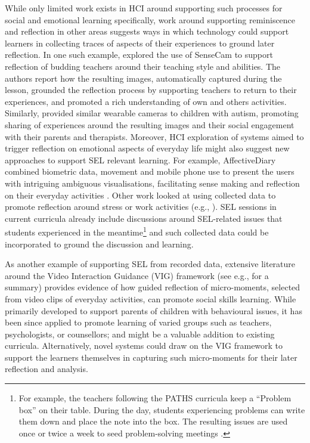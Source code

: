 \documentclass[prodmode,acmtochi]{acmsmall}
\begin{document}
While only limited work exists in HCI around supporting such processes for social and emotional learning specifically, work around supporting reminiscence and reflection in other areas suggests ways in which technology could support learners in collecting traces of aspects of their experiences to ground later reflection. In one such example,  explored the use of SenseCam to support reflection of budding teachers around their teaching style and abilities. The authors report how the resulting images, automatically captured during the lesson, grounded the reflection process by supporting teachers to return to their experiences, and promoted a rich understanding of own and others activities. Similarly,  provided similar wearable cameras to children with autism, promoting sharing of experiences around the resulting images and their social engagement with their parents and therapists. Moreover, HCI exploration of systems aimed to trigger reflection on emotional aspects of everyday life might also suggest new approaches to support SEL relevant learning. For example, AffectiveDiary combined biometric data, movement and mobile phone use to present the users with intriguing ambiguous visualisations, facilitating sense making and reflection on their everyday activities \cite{Stahl2008}. Other work looked at using collected data to promote reflection around stress \cite{Sanches2010} or work activities (e.g., \cite{McDuff2012}).
%
%
SEL sessions in current curricula already include discussions around SEL-related issues that students experienced in the meantime\footnote{For example, the teachers following the PATHS curricula keep a ``Problem box'' on their table. During the day, students experiencing problems can write them down and place the note into the box. The resulting issues are used once or twice a week to seed problem-solving meetings \cite{Kam2004}.} and such collected data could be incorporated to ground the discussion and learning. 

As another example of supporting SEL from recorded data, extensive literature around the Video Interaction Guidance (VIG) framework (see e.g., \cite{Kennedy2011} for a summary) provides evidence of how guided reflection of micro-moments, selected from video clips of everyday activities, can promote social skills learning. While primarily developed to support parents of children with behavioural issues, it has been since applied to promote learning of varied groups such as teachers, psychologists, or counsellors; and might be a valuable addition to existing curricula. Alternatively, novel systems could draw on the VIG framework to support the learners themselves in capturing such micro-moments for their later reflection and analysis. 
\end{document}
